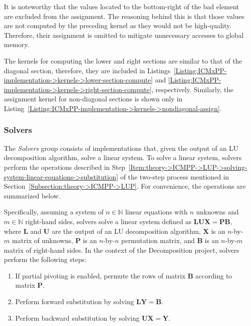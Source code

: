 It is noteworthy that the values located to the bottom-right of the bad element are excluded from the assignment. The reasoning behind this is that those values are not computed by the preceding kernel as they would not be high-quality. Therefore, their assignment is omitted to mitigate unnecessary accesses to global memory.

The kernels for computing the lower and right sections are similar to that of the diagonal section, therefore, they are included in Listings~\ref{Listing:ICMxPP-implementation->kernels->lower-section-compute} and \ref{Listing:ICMxPP-implementation->kernels->right-section-compute}, respectively. Similarly, the assignment kernel for non-diagonal sections is shown only in Listing~\ref{Listing:ICMxPP-implementation->kernels->nondiagonal-assign}.

\subsubsection{Solvers}\label{Subsection:implementation->decomposition-project->implemented-solutions->solvers}
The \textit{Solvers} group consists of implementations that, given the output of an LU decomposition algorithm, solve a linear system. To solve a linear system, solvers perform the operations described in Step~\ref{Item:theory->ICMPP->LUP->solving-system-linear-equations->substitution} of the two-step process mentioned in Section~\ref{Subsection:theory->ICMPP->LUP}. For convenience, the operations are summarized below.

Specifically, assuming a system of $n \in \mathbb{N}$ linear equations with $n$ unknowns and $m \in \mathbb{N}$ right-hand sides, solvers solve a linear system defined as $\mathbf{LUX} = \mathbf{PB}$, where $\mathbf{L}$ and $\mathbf{U}$ are the output of an LU decomposition algorithm, $\mathbf{X}$ is an $n$-by-$m$ matrix of unknowns, $\mathbf{P}$ is an $n$-by-$n$ permutation matrix, and $\mathbf{B}$ is an $n$-by-$m$ matrix of right-hand sides. In the context of the Decomposition project, solvers perform the following steps:

\begin{enumerate}
	\item If partial pivoting is enabled, permute the rows of matrix $\mathbf{B}$ according to matrix $\mathbf{P}$.
	\item \label{Item:implementation->decomposition-project->implemented-solutions->solvers->forward-substitution}
		Perform forward substitution by solving $\mathbf{LY} = \mathbf{B}$.
	\item \label{Item:implementation->decomposition-project->implemented-solutions->solvers->backward-substitution}
		Perform backward substitution by solving $\mathbf{UX} = \mathbf{Y}$.
\end{enumerate}


